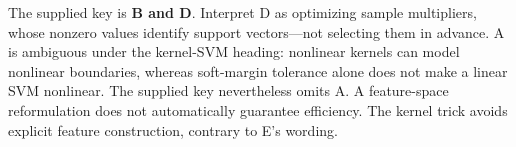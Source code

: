 The supplied key is \textbf{B and D}. Interpret D as optimizing sample multipliers, whose nonzero values identify support vectors—not selecting them in advance. A is ambiguous under the kernel-SVM heading: nonlinear kernels can model nonlinear boundaries, whereas soft-margin tolerance alone does not make a linear SVM nonlinear. The supplied key nevertheless omits A. A feature-space reformulation does not automatically guarantee efficiency. The kernel trick avoids explicit feature construction, contrary to E's wording.
